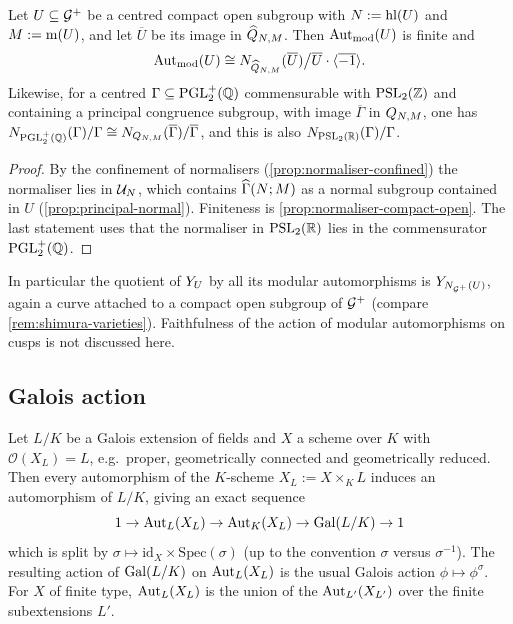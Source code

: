 \begin{proposition}
\label{prop:computing-modular-aut}
Let $U \subseteq \mathcal{G}^{+}$ be a centred compact open subgroup with
$N := \operatorname{hl}(U)$ and $M := \operatorname{m}(U)$, and let
$\overline{U}$ be its image in $\widehat{Q}_{N,M}$. Then
$\operatorname{Aut}_{\mathrm{mod}}(U)$ is finite and
\[
  \operatorname{Aut}_{\mathrm{mod}}(U) \cong
  N_{\widehat{Q}_{N,M}}(\overline{U})\big/
  \overline{U}\cdot\langle\overline{-1}\rangle .
\]
Likewise, for a centred $\Gamma \subseteq \mathrm{PGL}_{2}^{+}(\mathbb{Q})$ commensurable
with $\PSL{2}{\ZZ}$ and containing a principal congruence subgroup, with
image $\overline{\Gamma}$ in $Q_{N,M}$, one has
$N_{\mathrm{PGL}_{2}^{+}(\mathbb{Q})}(\Gamma)/\Gamma \cong
N_{Q_{N,M}}(\overline{\Gamma})/\overline{\Gamma}$, and
this is also $\Normalizer{\PSL{2}{\RR}}{\Gamma}/\Gamma$.
\end{proposition}

\begin{proof}
By the confinement of normalisers (\cref{prop:normaliser-confined}) the
normaliser lies in $\mathcal{U}_{N}$, which contains
$\GammaPrincipal[ad]{N}{M}$ as a normal subgroup contained in $U$
(\cref{prop:principal-normal}). Finiteness is
\cref{prop:normaliser-compact-open}. The last statement uses that the
normaliser in $\PSL{2}{\RR}$ lies in the commensurator $\mathrm{PGL}_{2}^{+}(\mathbb{Q})$.
\end{proof}

\begin{remark}
In particular the quotient of $Y_{U}$ by all its modular
automorphisms is $Y_{N_{\mathcal{G}^{+}}(U)}$, again a curve
attached to a compact open subgroup of $\mathcal{G}^{+}$ (compare
\cref{rem:shimura-varieties}). Faithfulness of the action of modular
automorphisms on cusps is not discussed here.
\end{remark}

\subsection{Galois action}

\begin{lemma}\label{lem:semilinear-sequence}
Let $L/K$ be a Galois extension of fields and $X$ a scheme over $K$ with
$\mathcal{O}(X_L) = L$, e.g.\ proper, geometrically connected and
geometrically reduced. Then every automorphism of the $K$-scheme
$X_L := X\times_K L$ induces an automorphism of $L/K$, giving an exact
sequence
\[
  1 \to \operatorname{Aut}_L(X_L) \to \operatorname{Aut}_K(X_L) \to \operatorname{Gal}(L/K) \to 1
\]
which is split by $\sigma \mapsto \mathrm{id}_X \times \mathrm{Spec}(\sigma)$
(up to the convention $\sigma$ versus $\sigma^{-1}$). The resulting action of
$\operatorname{Gal}(L/K)$ on $\operatorname{Aut}_L(X_L)$ is the usual Galois action
$\phi \mapsto \phi^{\sigma}$. For $X$ of finite type, $\operatorname{Aut}_L(X_L)$ is the
union of the $\operatorname{Aut}_{L'}(X_{L'})$ over the finite subextensions $L'$.
\end{lemma}

